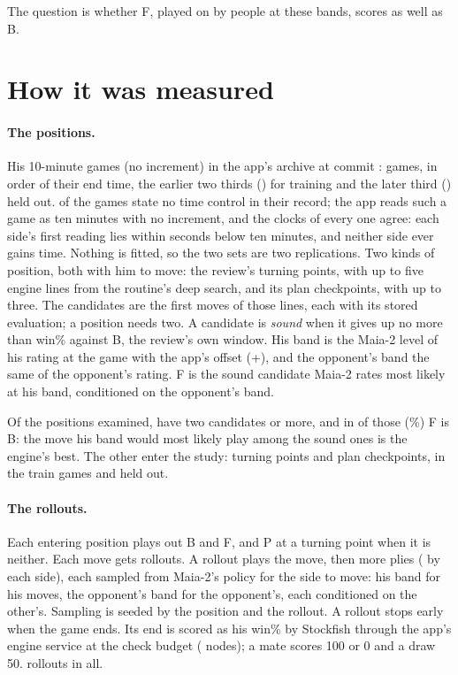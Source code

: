 \documentclass[11pt]{article}
\begin{document}
The question is whether F, played on by people at these bands, scores as well as B.

\section{How it was measured}

\paragraph{The positions.} His 10-minute games (no increment) in the app's archive at commit
\texttt{\AppCommit}: \Games{} games, in order of their end time, the earlier two thirds
(\TrainGames) for training and the later third (\HeldoutGames) held out. \Unstated{} of the games
state no time control in their record; the app reads such a game as ten minutes with no
increment, and the clocks of every one agree: each side's first reading lies within
\ClockSlack{} seconds below ten minutes, and neither side ever gains time. Nothing is fitted, so
the two sets are two replications. Two kinds of position, both with him to move: the review's
turning points, with up to five engine lines from the routine's deep search, and its plan
checkpoints, with up to three. The candidates are the first moves of those lines, each with its
stored evaluation; a position needs two. A candidate is \emph{sound} when it gives up no more
than \Window{} win\% against B, the review's own window. His band is the Maia-2 level of his
rating at the game with the app's offset (+\Offset), and the opponent's band the same of the
opponent's rating. F is the sound candidate Maia-2 rates most likely at his band, conditioned on
the opponent's band.

Of the \Examined{} positions examined, \WithTwo{} have two candidates or more, and in
\SameAsBest{} of those (\SameAsBestPct\%) F is B: the move his band would most likely play among
the sound ones is the engine's best. The other \Entering{} enter the study: \Turning{} turning
points and \Plans{} plan checkpoints, \TrainPositions{} in the train games and
\HeldoutPositions{} held out.

\paragraph{The rollouts.} Each entering position plays out B and F, and P at a turning point when
it is neither. Each move gets \Rollouts{} rollouts. A rollout plays the move, then \Plies{} more
plies (\HalfPlies{} by each side), each sampled from Maia-2's policy for the side to move: his
band for his moves, the opponent's band for the opponent's, each conditioned on the other's.
Sampling is seeded by the position and the rollout. A rollout stops early when the game ends. Its
end is scored as his win\% by Stockfish through the app's engine service at the check budget
(\BudgetNodes{} nodes); a mate scores 100 or 0 and a draw 50. \RolloutCount{} rollouts in all.
\end{document}
